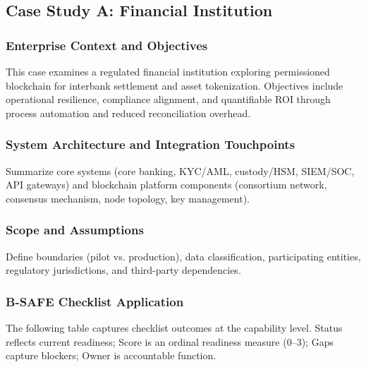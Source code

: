 \subsection{Case Study A: Financial Institution}

\subsubsection{Enterprise Context and Objectives}
This case examines a regulated financial institution exploring permissioned blockchain for interbank settlement and asset tokenization. Objectives include operational resilience, compliance alignment, and quantifiable ROI through process automation and reduced reconciliation overhead.

\subsubsection{System Architecture and Integration Touchpoints}
Summarize core systems (core banking, KYC/AML, custody/HSM, SIEM/SOC, API gateways) and blockchain platform components (consortium network, consensus mechanism, node topology, key management).

\subsubsection{Scope and Assumptions}
Define boundaries (pilot vs. production), data classification, participating entities, regulatory jurisdictions, and third-party dependencies.

\subsubsection{B-SAFE Checklist Application}
The following table captures checklist outcomes at the capability level. Status reflects current readiness; Score is an ordinal readiness measure (0–3); Gaps capture blockers; Owner is accountable function.


